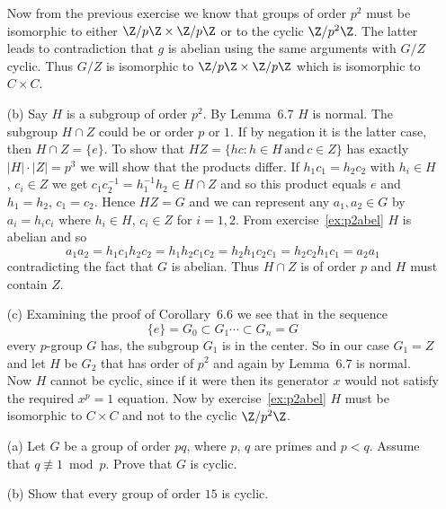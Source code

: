\documentclass[12pt]{book}
\newcommand{\Zm}[1]{\Z/#1\Z} %
\newcommand{\eG}{\ensuremath{\{e\}}}
\newcounter{myenumi}
\newenvironment{myenumerate}
{\begin{enumerate}
 \setcounter{enumi}{\themyenumi}
}
{\setcounter{myenumi}{\theenumi}
 \end{enumerate}}
\begin{document}
\begin{myenumerate}
\begin{itemize}
     Now from the previous exercise we know that groups of order \(p^2\)
     must be isomorphic to either \(\Zm{p}\times\Zm{p}\)
     or to the cyclic
     \(\Zm{p^2}\). The latter leads to contradiction that $g$ is abelian
     using the same arguments with \(G/Z\) cyclic.
     Thus \(G/Z\) is isomorphic to \(\Zm{p}\times\Zm{p}\) which is
     isomorphic to \(C\times C\).

 \item[(b)]
     Say $H$ is a subgroup of order \(p^2\). By Lemma~6.7 $H$ is normal.
     The subgroup \(H\cap Z\)
     could be or order $p$ or $1$.
     If by negation it is the latter case, then \(H\cap Z = \eG\).
     To show that \(HZ = \{hc: h\in H \, \textrm{and} \, c\in Z\}\)
     has exactly \(|H|\cdot|Z|=p^3\) we will show that the products
     differ. If
     \(h_1 c_1 = h_2 c_2\) with \(h_i\in H\), \(c_i\in Z\) we get
     \(c_1c_2^{-1} = h_1^{-1}h_2 \in H\cap Z\) and so this product equals $e$
     and \(h_1=h_2\), \(c_1=c_2\). Hence \(HZ=G\) and we can
     represent any \(a_1,a_2\in G\) by \(a_i=h_i c_i\) where
      \(h_i\in H\), \(c_i\in Z\) for \(i=1,2\).
      From exercise~\ref{ex:p2abel} $H$ is abelian and so
      \begin{equation}
      a_1a_2 = h_1 c_1 h_2 c_2 = h_1 h_2  c_1 c_2 =
          h_2 h_1  c_2 c_1 = h_2 c_2 h_1 c_1 = a_2a_1
      \end{equation}
      contradicting the fact that $G$ is abelian.
      Thus  \(H\cap Z\) is of order $p$ and $H$ must contain $Z$.

 \item[(c)]
      Examining the proof of Corollary~6.6 we see that
      in the sequence
      \[\eG=G_0 \subset G_1 \cdots \subset G_n = G\]
      every $p$-group $G$ has, the subgroup \(G_1\) is in the center.
      So in our case \(G_1 = Z\) and  let $H$ be \(G_2\)
      that has order of \(p^2\)
      and again by Lemma~6.7 is normal.
      Now $H$ cannot be cyclic, since if it were then
      its generator $x$ would not satisfy the required
      \(x^p=1\) equation.
      Now by exercise~\ref{ex:p2abel}  $H$
      must be isomorphic to \(C\times C\) and not to the cyclic \(\Zm{p^2}\).
\end{itemize}

\begin{excopy}
\begin{itemize}
 \item[(a)] Let $G$ be a group of order \(pq\), where $p$, $q$ are primes
            and \(p<q\). Assume that \(q\not\equiv 1 \bmod p\).
            Prove that  $G$ is cyclic.
 \item[(b)] Show that every group of order \(15\) is cyclic.
\end{itemize}
\end{excopy}  \label{ex:GpLTq}


\end{myenumerate}
\end{document}
